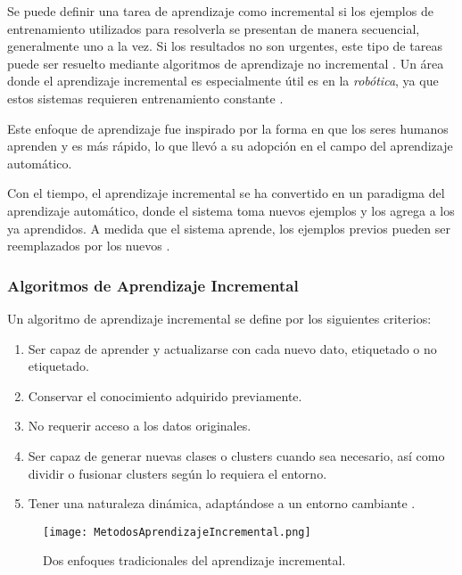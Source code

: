         Se puede definir una tarea de aprendizaje como incremental si los ejemplos de entrenamiento utilizados para resolverla se presentan de manera secuencial, generalmente uno a la vez. Si los resultados no son urgentes, este tipo de tareas puede ser resuelto mediante algoritmos de aprendizaje no incremental \cite{GiraudCarrier2000}. Un área donde el aprendizaje incremental es especialmente útil es en la \textit{robótica}, ya que estos sistemas requieren entrenamiento constante \cite{GiraudCarrier2000}.

        Este enfoque de aprendizaje fue inspirado por la forma en que los seres humanos aprenden y es más rápido, lo que llevó a su adopción en el campo del aprendizaje automático.

        Con el tiempo, el aprendizaje incremental se ha convertido en un paradigma del aprendizaje automático, donde el sistema toma nuevos ejemplos y los agrega a los ya aprendidos. A medida que el sistema aprende, los ejemplos previos pueden ser reemplazados por los nuevos \cite{liu2015}.

        \subsubsection{Algoritmos de Aprendizaje Incremental}

            Un algoritmo de aprendizaje incremental se define por los siguientes criterios:
            \begin{enumerate}
                \item Ser capaz de aprender y actualizarse con cada nuevo dato, etiquetado o no etiquetado.
                \item Conservar el conocimiento adquirido previamente.
                \item No requerir acceso a los datos originales.
                \item Ser capaz de generar nuevas clases o clusters cuando sea necesario, así como dividir o fusionar clusters según lo requiera el entorno.
                \item Tener una naturaleza dinámica, adaptándose a un entorno cambiante \cite{Deshmukh2013}.
            \end{enumerate}

            \begin{figure}[H]
                \centering
                \texttt{[image: MetodosAprendizajeIncremental.png]}
                \caption{Dos enfoques tradicionales del aprendizaje incremental.}
                \label{fig:incremental_learning_algorithm}
            \end{figure}

